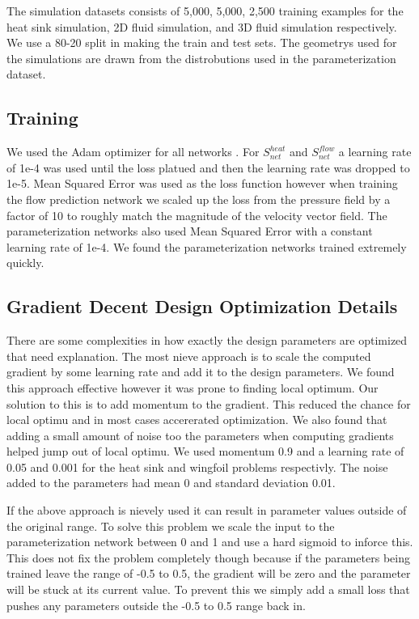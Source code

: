\documentclass{article} %
\begin{document}
The simulation datasets consists of 5,000, 5,000, 2,500 training examples for the heat sink simulation, 2D fluid simulation, and 3D fluid simulation respectively. We use a 80-20 split in making the train and test sets. The geometrys used for the simulations are drawn from the distrobutions used in the parameterization dataset.

\subsection{Training}

We used the Adam optimizer for all networks \cite{kingma2014adam}. For $S^{heat}_{net}$ and $S^{flow}_{net}$ a learning rate of 1e-4 was used until the loss platued and then the learning rate was dropped to 1e-5. Mean Squared Error was used as the loss function however when training the flow prediction network we scaled up the loss from the pressure field by a factor of 10 to roughly match the magnitude of the velocity vector field. The parameterization networks also used Mean Squared Error with a constant learning rate of 1e-4. We found the parameterization networks trained extremely quickly.

\subsection{Gradient Decent Design Optimization Details}

There are some complexities in how exactly the design parameters are optimized that need explanation. The most nieve approach is to scale the computed gradient by some learning rate and add it to the design parameters. We found this approach effective however it was prone to finding local optimum. Our solution to this is to add momentum to the gradient. This reduced the chance for local optimu and in most cases accererated optimization. We also found that adding a small amount of noise too the parameters when computing gradients helped jump out of local optimu. We used momentum 0.9 and a learning rate of 0.05 and 0.001 for the heat sink and wingfoil problems respectivly. The noise added to the parameters had mean 0 and standard deviation 0.01.

If the above approach is nievely used it can result in parameter values outside of the original range. To solve this problem we scale the input to the parameterization network between 0 and 1 and use a hard sigmoid to inforce this. This does not fix the problem completely though because if the parameters being trained leave the range of -0.5 to 0.5, the gradient will be zero and the parameter will be stuck at its current value. To prevent this we simply add a small loss that pushes any parameters outside the -0.5 to 0.5 range back in.
\end{document}
